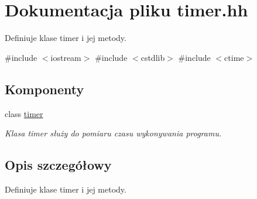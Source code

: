 \hypertarget{timer_8hh}{\section{\-Dokumentacja pliku timer.\-hh}
\label{timer_8hh}
}


\-Definiuje klase timer i jej metody.  


{\ttfamily \#include $<$iostream$>$}\*
{\ttfamily \#include $<$cstdlib$>$}\*
{\ttfamily \#include $<$ctime$>$}\*
\subsection*{\-Komponenty}
\begin{DoxyCompactItemize}
\item 
class \hyperlink{classtimer}{timer}
\begin{DoxyCompactList}\small\item\em \-Klasa timer służy do pomiaru czasu wykonywania programu. \end{DoxyCompactList}\end{DoxyCompactItemize}


\subsection{\-Opis szczegółowy}
\-Definiuje klase timer i jej metody. 